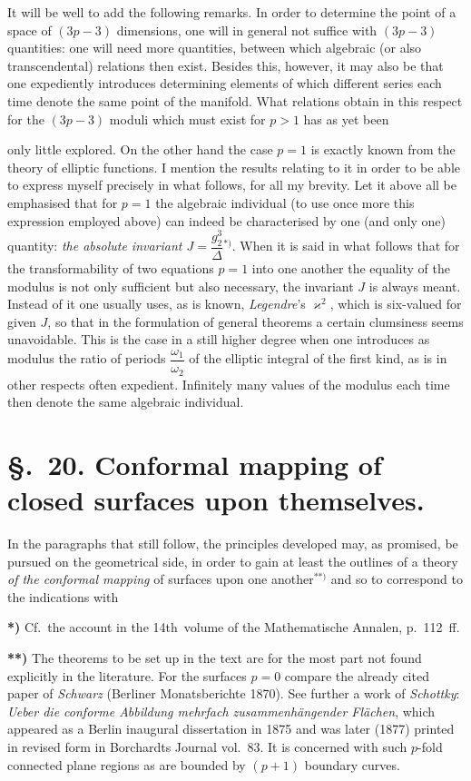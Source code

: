 \documentclass{article}
\begin{document}
It will be well to add the following remarks. In order to determine the point of a space of $(3p - 3)$ dimensions, one will in general not suffice with $(3p - 3)$ quantities: one will need more quantities, between which algebraic (or also transcendental) relations then exist. Besides this, however, it may also be that one expediently introduces determining elements of which different series each time denote the same point of the manifold. What relations obtain in this respect for the $(3p - 3)$ moduli which must exist for $p > 1$ has as yet been

only little explored. On the other hand the case $p = 1$ is exactly known from the theory of elliptic functions. I mention the results relating to it in order to be able to express myself precisely in what follows, for all my brevity. Let it above all be emphasised that for $p = 1$ the algebraic individual (to use once more this expression employed above) can indeed be characterised by one (and only one) quantity: \emph{the absolute invariant $J = \dfrac{g_{2}^{3}}{\Delta}$}${}^{*)}$. When it is said in what follows that for the transformability of two equations $p = 1$ into one another the equality of the modulus is not only sufficient but also necessary, the invariant $J$ is always meant. Instead of it one usually uses, as is known, \emph{Legendre}'s $\varkappa^{2}$, which is six-valued for given $J$, so that in the formulation of general theorems a certain clumsiness seems unavoidable. This is the case in a still higher degree when one introduces as modulus the ratio of periods $\dfrac{\omega_{1}}{\omega_{2}}$ of the elliptic integral of the first kind, as is in other respects often expedient. Infinitely many values of the modulus each time then denote the same algebraic individual.

\section*{§.~20. Conformal mapping of closed surfaces upon themselves.}

In the paragraphs that still follow, the principles developed may, as promised, be pursued on the geometrical side, in order to gain at least the outlines of a theory \emph{of the conformal mapping} of surfaces upon one another${}^{**)}$ and so to correspond to the indications with

\textbf{*)} Cf.\ the account in the 14th\ volume of the Mathematische Annalen, p.~112~ff.

\textbf{**)} The theorems to be set up in the text are for the most part not found explicitly in the literature. For the surfaces $p = 0$ compare the already cited paper of \emph{Schwarz} (Berliner Monatsberichte 1870). See further a work of \emph{Schottky}: \emph{Ueber die conforme Abbildung mehrfach zusammenhängender Flächen}, which appeared as a Berlin inaugural dissertation in 1875 and was later (1877) printed in revised form in Borchardts Journal vol.~83. It is concerned with such $p$-fold connected plane regions as are bounded by $(p + 1)$ boundary curves.
\end{document}
